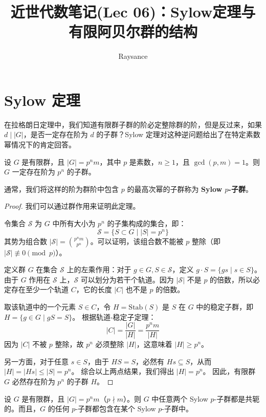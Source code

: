 \documentclass[11pt]{article}
\title{近世代数笔记(Lec 06)：Sylow定理与有限阿贝尔群的结构}
\author{Raysance}
\date{}
\begin{document}
\maketitle

\section{Sylow 定理}

在拉格朗日定理中，我们知道有限群子群的阶必定整除群的阶，但是反过来，如果 $d \mid |G|$，是否一定存在阶为 $d$ 的子群？Sylow 定理对这种逆问题给出了在特定素数幂情况下的肯定回答。

\begin{cntheorem}
设 $G$ 是有限群，且 $|G|=p^n m$，其中 $p$ 是素数，$n \ge 1$，且 $\gcd(p,m)=1$。则 $G$ 一定存在阶为 $p^n$ 的子群。

通常，我们将这样的阶为群阶中包含 $p$ 的最高次幂的子群称为 \textbf{Sylow $p$-子群}。
\end{cntheorem}

\begin{proof}
我们可以通过群作用来证明此定理。

令集合 $\mathcal{S}$ 为 $G$ 中所有大小为 $p^n$ 的子集构成的集合，即：
\[ \mathcal{S} = \{ S \subset G \mid |S| = p^n \} \]
其势为组合数 $|\mathcal{S}| = \binom{p^n m}{p^n}$。可以证明，该组合数不能被 $p$ 整除（即 $|\mathcal{S}| \not\equiv 0 \pmod p$）。

定义群 $G$ 在集合 $\mathcal{S}$ 上的左乘作用：对于 $g \in G, S \in \mathcal{S}$，定义 $g \cdot S = \{ gs \mid s \in S \}$。
由于 $G$ 作用在 $\mathcal{S}$ 上，$\mathcal{S}$ 可以划分为若干个轨道。因为 $|\mathcal{S}|$ 不是 $p$ 的倍数，所以必定存在至少一个轨道 $C$，它的长度 $|C|$ 也不是 $p$ 的倍数。

取该轨道中的一个元素 $S \in C$，令 $H = \text{Stab}(S)$ 是 $S$ 在 $G$ 中的稳定子群，即 $H = \{ g \in G \mid gS = S \}$。
根据轨道-稳定子定理：
\[ |C| = \frac{|G|}{|H|} = \frac{p^n m}{|H|} \]
因为 $|C|$ 不被 $p$ 整除，故 $p^n$ 必须整除 $|H|$，这意味着 $|H| \ge p^n$。

另一方面，对于任意 $s \in S$，由于 $H S = S$，必然有 $H s \subseteq S$，从而 $|H| = |Hs| \le |S| = p^n$。
综合以上两点结果，我们得出 \textbf{$|H| = p^n$}。
因此，有限群 $G$ 必然存在阶为 $p^n$ 的子群 $H$。
\end{proof}

\begin{cntheorem}
设 $G$ 是有限群，且 $|G|=p^n m$（$p \nmid m$）。则 $G$ 中任意两个 Sylow $p$-子群都是共轭的。而且，$G$ 的任何 $p$-子群都包含在某个 Sylow $p$-子群中。
\end{cntheorem}
\end{document}
